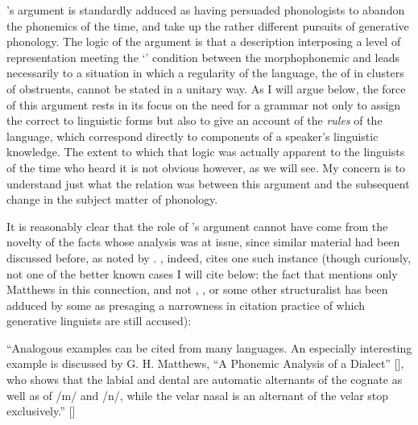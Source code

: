 {\Halle}'s argument is standardly adduced as having persuaded
phonologists to abandon the phonemics of the time, and take up the
rather different pursuits of generative phonology. The logic of the
argument is that a description interposing a level of representation
meeting the `' condition between the morphophonemic and
 leads necessarily to a situation in which a
regularity of the language, the  of  in clusters of
obstruents, cannot be stated in a unitary way. As I will argue below,
the force of this argument rests in its focus on the need for a
grammar not only to assign the correct  to linguistic
forms but also to give an account of the \emph{rules} of the language,
 which correspond directly to components of a speaker's
linguistic knowledge. The extent to which that logic was actually
apparent to the linguists of the time who heard it is not obvious
however, as we will see.  My concern is to understand just what the
relation was between this argument and the subsequent change in the
subject matter of phonology.
  
It is reasonably clear that the role of {\Halle}'s argument cannot have
come from the novelty of the facts whose analysis was at issue, since
similar material had been discussed before, as noted by
\citet[288]{ferguson62:rvw.spr}. {\Halle}, indeed, cites one such
instance (though curiously, not one of the better known cases I will
cite below: the fact that {\Halle} mentions only Matthews in this
connection, and not {\Bloch}, {\Bloomfield}, or some other structuralist has
been adduced by some as presaging a narrowness in citation practice of
which generative linguists are still accused):
  
``Analogous examples can be cited from many languages. An especially
interesting example is discussed by G. H. Matthews, ``A Phonemic
Analysis of a  Dialect'' {[\citealt{matthews:dakota_phonemics}]}, who
shows that the labial and dental  are automatic
alternants of the cognate  as well as of /m/ and /n/, while the
velar nasal is an alternant of the velar stop exclusively.''
{[\citealt[22, fn. 12]{halle:spr}]}
  
